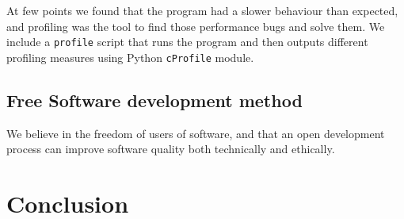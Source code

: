 \documentclass[a4paper,10pt]{article}
\begin{document}
At few points we found that the program had a slower behaviour than
expected, and profiling was the tool to find those performance bugs
and solve them. We include a \texttt{profile} script that runs the
program and then outputs different profiling measures
using Python \texttt{cProfile} module.


\subsection{Free Software development method}

We believe in the freedom of users of software, and that an open
development process can improve software quality both technically and
ethically.




\section{Conclusion}



\end{document}
